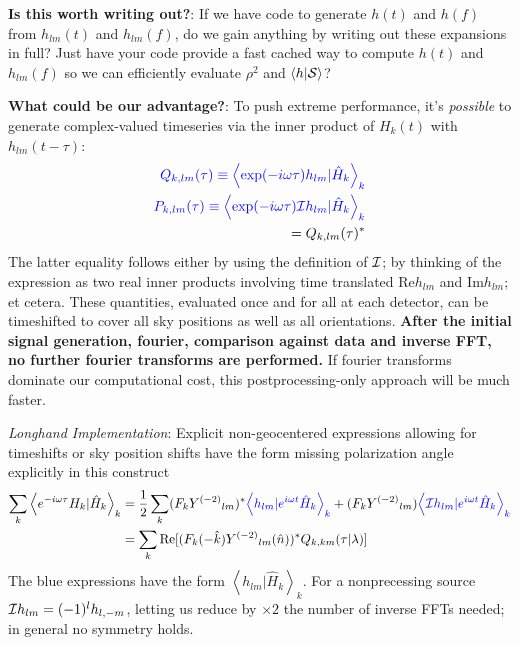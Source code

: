 \documentclass[twocolumn,prd,nofootinbib]{revtex4}
\newcommand\editremark[1]{{\color{red} #1}}
\newcommand\Y[1]{Y^{(#1)}{}}
\newcommand\qmstateproduct[2]{\left\langle#1|#2\right\rangle}
\begin{document}
\noindent \textbf{Is this worth writing out?}: If we have code to generate $h(t)$ and $h(f)$ from $h_{lm}(t)$ and
$h_{lm}(f)$, do we gain anything by writing out these expansions in full?  Just have your code provide a fast cached way
to compute $h(t)$ and $h_{lm}(f)$ so we can efficiently evaluate $\rho^2$ and $\qmstateproduct{h}{{\cal S}}$?

\noindent \textbf{What could be our advantage?}: To push extreme performance, it's \emph{possible} to generate complex-valued
timeseries via the inner product of $H_k(t)$ with $h_{lm}(t-\tau)$:
\begin{eqnarray}
{\color{blue}Q_{k,lm}(\tau) \equiv \qmstateproduct{\exp(-i\omega \tau) h_{lm}}{\hat{H}_k}_k} \\
{\color{blue}P_{k,lm}(\tau) \equiv \qmstateproduct{\exp(-i\omega \tau){\cal I}h_{lm}}{\hat{H}_k}_k}\nonumber \\
 = Q_{k,lm}(\tau)^*
\end{eqnarray}
The latter equality follows either by using the definition of ${\cal I}$; by thinking of the expression as two real
inner products involving time translated $\text{Re}h_{lm}$ and $\text{Im}h_{lm}$; et cetera. 
These quantities, evaluated once and for all at each detector, can be  timeshifted to cover all sky positions as well as all orientations.  \textbf{After the
initial signal generation, fourier, comparison against data and inverse FFT, no further fourier transforms are performed. }
%
If fourier transforms dominate our computational cost, this postprocessing-only approach will be much faster.

\begin{widetext}
\noindent \emph{Longhand Implementation}: Explicit non-geocentered expressions allowing for timeshifts or sky position
shifts have the form \editremark{missing polarization angle explicitly in this construct}
\begin{align}
\label{eq:IndividualDetectorLikelihoodTimeseries:ViaSpinWeightBasis}
\sum_k\qmstateproduct{e^{-i \omega \tau} H_k}{\hat{H}_k}_k
&= \frac{1}{2} \sum_k (F_k \Y{-2}_{lm})^* {\color{blue} \qmstateproduct{ h_{lm}}{e^{i\omega t}\hat{H}_k}_k}
   + (F_k \Y{-2}_{lm}) {\color{blue}\qmstateproduct{{\cal I} h_{lm}}{e^{i\omega t}\hat{H}_k}_k} \\
 &= \sum_k \text{Re}[(F_k(-\hat{k}) \Y{-2}_{lm}(\hat{n}))^* Q_{k,km}(\tau|\lambda)]
\end{align}
The blue expressions have the form $\qmstateproduct{h_{lm}}{\hat{H}_k}_k$.  For a nonprecessing source ${\cal I} h_{lm}
=(-1)^l h_{l,-m}$, letting us reduce by $\times 2$ the number of inverse FFTs needed; in general no symmetry holds. 

\end{widetext}
\end{document}
